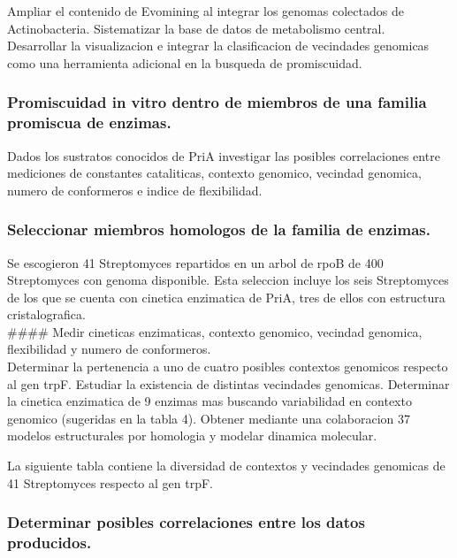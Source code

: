 \documentclass[12pt,twoside]{reedthesis}
\begin{document}
  Ampliar el contenido de Evomining al integrar los genomas colectados de
  Actinobacteria. Sistematizar la base de datos de metabolismo central.\\
  Desarrollar la visualizacion e integrar la clasificacion de vecindades
  genomicas como una herramienta adicional en la busqueda de promiscuidad.
  
  \subsubsection{Promiscuidad in vitro dentro de miembros de una familia
  promiscua de
  enzimas.}\label{promiscuidad-in-vitro-dentro-de-miembros-de-una-familia-promiscua-de-enzimas.}
  
  Dados los sustratos conocidos de PriA investigar las posibles
  correlaciones entre mediciones de constantes cataliticas, contexto
  genomico, vecindad genomica, numero de conformeros e indice de
  flexibilidad.
  
  \subsubsection{Seleccionar miembros homologos de la familia de
  enzimas.}\label{seleccionar-miembros-homologos-de-la-familia-de-enzimas.}
  
  Se escogieron 41 Streptomyces repartidos en un arbol de rpoB de 400
  Streptomyces con genoma disponible. Esta seleccion incluye los seis
  Streptomyces de los que se cuenta con cinetica enzimatica de PriA, tres
  de ellos con estructura cristalografica.\\
  \#\#\#\# Medir cineticas enzimaticas, contexto genomico, vecindad
  genomica, flexibilidad y numero de conformeros.\\
  Determinar la pertenencia a uno de cuatro posibles contextos genomicos
  respecto al gen trpF. Estudiar la existencia de distintas vecindades
  genomicas. Determinar la cinetica enzimatica de 9 enzimas mas buscando
  variabilidad en contexto genomico (sugeridas en la tabla 4). Obtener
  mediante una colaboracion 37 modelos estructurales por homologia y
  modelar dinamica molecular.
  
  La siguiente tabla contiene la diversidad de contextos y vecindades
  genomicas de 41 Streptomyces respecto al gen trpF.
  
  \subsubsection{Determinar posibles correlaciones entre los datos
  producidos.}\label{determinar-posibles-correlaciones-entre-los-datos-producidos.}
  
\end{document}
